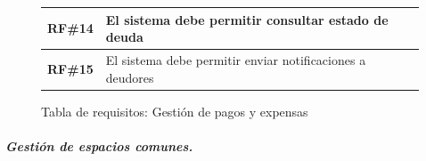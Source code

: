 \begin{figure}[H]
\begin{tabular}{|l|p{11cm}|}
            \textbf{RF\#14} 
        
        & 

            El sistema debe permitir consultar estado de deuda 
        
    \\ \hline
    
            \textbf{RF\#15} 
        
        & 

            El sistema debe permitir enviar notificaciones a deudores 
        
    \\ \hline
    \end{tabular}
    \caption{Tabla de requisitos: Gestión de pagos y expensas}
\end{figure}

\subparagraph{Gestión de espacios comunes.}

